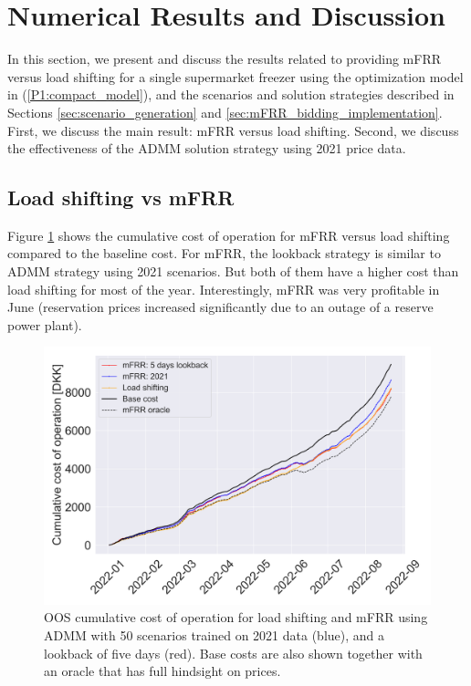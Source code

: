 
\section{Numerical Results and Discussion}\label{sec:results}
In this section, we present and discuss the results related to providing mFRR versus load shifting for a single supermarket freezer using the optimization model in (\ref{P1:compact_model}), and the scenarios and solution strategies described in Sections \ref{sec:scenario_generation} and \ref{sec:mFRR_bidding_implementation}. First, we discuss the main result: mFRR versus load shifting. Second, we discuss the effectiveness of the ADMM solution strategy using 2021 price data.

\subsection{Load shifting vs mFRR}
Figure \ref{fig:cumulative_cost_comparison} shows the cumulative cost of operation for mFRR versus load shifting compared to the baseline cost. For mFRR, the lookback strategy is similar to ADMM strategy using 2021 scenarios. But both of them have a higher cost than load shifting for most of the year. Interestingly, mFRR was very profitable in June (reservation prices increased significantly due to an outage of a reserve power plant).

\begin{figure}[!t]
    \centering
    \includegraphics[width=\columnwidth]{../figures/cumulative_cost_comparison.png}
    \caption{OOS cumulative cost of operation for load shifting and mFRR using ADMM with 50 scenarios trained on 2021 data (blue), and a lookback of five days (red). Base costs are also shown together with an oracle that has full hindsight on prices.}
    \label{fig:cumulative_cost_comparison}
\end{figure}

